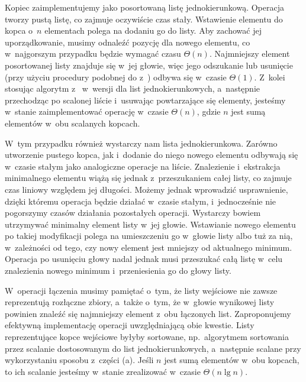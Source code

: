 
\subproblem %
Kopiec zaimplementujemy jako posortowaną listę jednokierunkową.
Operacja  tworzy pustą listę, co zajmuje oczywiście czas stały.
Wstawienie elementu do kopca o~$n$ elementach polega na dodaniu go do listy.
Aby zachować jej uporządkowanie, musimy odnaleźć pozycję dla nowego elementu, co w~najgorszym przypadku będzie wymagać czasu $\Theta(n)$.
Najmniejszy element posortowanej listy znajduje się w~jej głowie, więc jego odszukanie lub usunięcie (przy użyciu procedury podobnej do  z~) odbywa się w~czasie $\Theta(1)$.
Z~kolei stosując algorytm z~ w~wersji dla list jednokierunkowych, a~następnie przechodząc po scalonej liście i~usuwając powtarzające się elementy, jesteśmy w~stanie zaimplementować operację  w~czasie $\Theta(n)$, gdzie $n$ jest sumą elementów w~obu scalanych kopcach.

\subproblem %
W~tym przypadku również wystarczy nam lista jednokierunkowa.
Zarówno utworzenie pustego kopca, jak i~dodanie do niego nowego elementu odbywają się w~czasie stałym jako analogiczne operacje na liście.
Znalezienie i~ekstrakcja minimalnego elementu wiążą się jednak z~przeszukaniem całej listy, co zajmuje czas liniowy względem jej długości.
Możemy jednak wprowadzić usprawnienie, dzięki któremu operacja  będzie działać w~czasie stałym, i~jednocześnie nie pogorszymy czasów działania pozostałych operacji.
Wystarczy bowiem utrzymywać minimalny element listy w~jej głowie.
Wstawianie nowego elementu po takiej modyfikacji polega na umieszczeniu go w~głowie listy albo tuż za nią, w~zależności od tego, czy nowy element jest mniejszy od aktualnego minimum.
Operacja  po usunięciu głowy nadal jednak musi przeszukać całą listę w~celu znalezienia nowego minimum i~przeniesienia go do głowy listy.

W~operacji łączenia musimy pamiętać o~tym, że listy wejściowe nie zawsze reprezentują rozłączne zbiory, a~także o~tym, że w~głowie wynikowej listy powinien znaleźć się najmniejszy element z~obu łączonych list.
Zaproponujemy efektywną implementację operacji  uwzględniającą obie kwestie.
Listy reprezentujące kopce wejściowe byłyby sortowane, np.\ algorytmem sortowania przez scalanie dostosowanym do list jednokierunkowych, a~następnie scalane przy wykorzystaniu sposobu z~części (a).
Jeśli $n$ jest sumą elementów w~obu kopcach, to ich scalanie jesteśmy w~stanie zrealizować w~czasie $\Theta(n\lg n)$.

